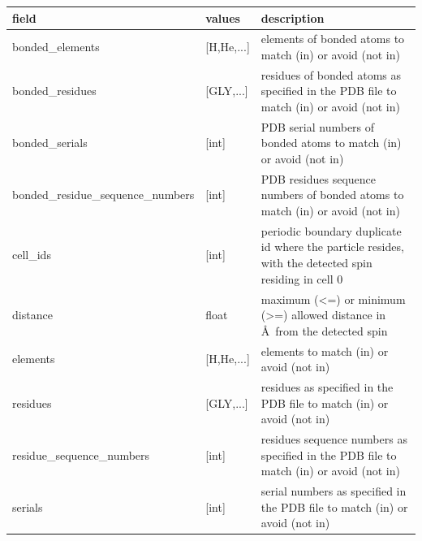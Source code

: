 \documentclass{book}
\begin{document}
\begin{center}
\begin{tabular}{| m{20em} | m{1.5cm}| m{7cm} |}
 \hline 
 \textbf{field} & \textbf{values} & \textbf{description} \\ 
 \hline 
 bonded\_elements & [H,He,...] & elements of bonded atoms 
 to match (in) or avoid (not in)\\
 \hline 
 bonded\_residues & [GLY,...] & residues of bonded atoms 
 as specified in the PDB file to match (in) or avoid (not in)\\
 \hline 
 bonded\_serials & [int] & PDB serial numbers of bonded atoms 
 to match (in) or avoid (not in)\\
 \hline 
 bonded\_residue\_sequence\_numbers & [int] & PDB residues sequence numbers 
 of bonded atoms to match (in) or avoid (not in)\\
 \hline 
 cell\_ids & [int] & periodic boundary duplicate id where the particle resides,
 with the detected spin residing in cell 0 
 \\
 \hline 
 distance & float & maximum (<=) or minimum (>=) allowed distance in 
 \AA~from the detected spin
 \\
 \hline 
 elements & [H,He,...] & elements to match (in) or avoid (not in)\\
 \hline 
 residues & [GLY,...] & residues as specified in the PDB file
 to match (in) or avoid (not in)\\
 \hline 
 residue\_sequence\_numbers & [int] & residues sequence numbers 
 as specified in the PDB file to match (in) or avoid (not in)\\
 \hline 
 serials & [int] & serial numbers as specified in the PDB file
 to match (in) or avoid (not in)\\
 \hline 
\end{tabular}
\end{center}  
\end{document}
